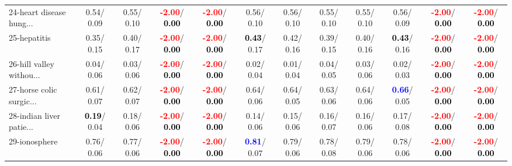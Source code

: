 \begin{table}[h]
\begin{center}
{\begin{tabular}{lc|c|c|c|c|c|c|c|c|c|c}
24-heart disease hung... &   0.54/  0.09 &   0.55/  0.10 & \textcolor{red}{\textbf{ -2.00}}/\textcolor{black}{\textbf{  0.00}} & \textcolor{red}{\textbf{ -2.00}}/\textcolor{black}{\textbf{  0.00}} &   0.56/  0.10 &   0.56/  0.10 &   0.55/  0.10 &   0.55/  0.10 &   0.56/  0.09 & \textcolor{red}{\textbf{ -2.00}}/\textcolor{black}{\textbf{  0.00}} & \textcolor{red}{\textbf{ -2.00}}/\textcolor{black}{\textbf{  0.00}} \\
25-hepatitis &   0.35/  0.15 &   0.40/  0.17 & \textcolor{red}{\textbf{ -2.00}}/\textcolor{black}{\textbf{  0.00}} & \textcolor{red}{\textbf{ -2.00}}/\textcolor{black}{\textbf{  0.00}} & \textcolor{black}{\textbf{  0.43}}/  0.17 &   0.42/  0.16 &   0.39/  0.15 &   0.40/  0.16 & \textcolor{black}{\textbf{  0.43}}/  0.16 & \textcolor{red}{\textbf{ -2.00}}/\textcolor{black}{\textbf{  0.00}} & \textcolor{red}{\textbf{ -2.00}}/\textcolor{black}{\textbf{  0.00}} \\
26-hill valley withou... &   0.04/  0.06 &   0.03/  0.06 & \textcolor{red}{\textbf{ -2.00}}/\textcolor{black}{\textbf{  0.00}} & \textcolor{red}{\textbf{ -2.00}}/\textcolor{black}{\textbf{  0.00}} &   0.02/  0.04 &   0.01/  0.04 &   0.04/  0.05 &   0.03/  0.06 &   0.02/  0.03 & \textcolor{red}{\textbf{ -2.00}}/\textcolor{black}{\textbf{  0.00}} & \textcolor{red}{\textbf{ -2.00}}/\textcolor{black}{\textbf{  0.00}} \\
27-horse colic surgic... &   0.61/  0.07 &   0.62/  0.07 & \textcolor{red}{\textbf{ -2.00}}/\textcolor{black}{\textbf{  0.00}} & \textcolor{red}{\textbf{ -2.00}}/\textcolor{black}{\textbf{  0.00}} &   0.64/  0.06 &   0.64/  0.05 &   0.63/  0.06 &   0.64/  0.06 & \textcolor{blue}{\textbf{  0.66}}/  0.05 & \textcolor{red}{\textbf{ -2.00}}/\textcolor{black}{\textbf{  0.00}} & \textcolor{red}{\textbf{ -2.00}}/\textcolor{black}{\textbf{  0.00}} \\
28-indian liver patie... & \textcolor{black}{\textbf{  0.19}}/  0.04 &   0.18/  0.06 & \textcolor{red}{\textbf{ -2.00}}/\textcolor{black}{\textbf{  0.00}} & \textcolor{red}{\textbf{ -2.00}}/\textcolor{black}{\textbf{  0.00}} &   0.14/  0.06 &   0.15/  0.06 &   0.16/  0.07 &   0.16/  0.06 &   0.17/  0.08 & \textcolor{red}{\textbf{ -2.00}}/\textcolor{black}{\textbf{  0.00}} & \textcolor{red}{\textbf{ -2.00}}/\textcolor{black}{\textbf{  0.00}} \\ \hline
29-ionosphere &   0.76/  0.06 &   0.77/  0.06 & \textcolor{red}{\textbf{ -2.00}}/\textcolor{black}{\textbf{  0.00}} & \textcolor{red}{\textbf{ -2.00}}/\textcolor{black}{\textbf{  0.00}} & \textcolor{blue}{\textbf{  0.81}}/  0.07 &   0.79/  0.06 &   0.78/  0.08 &   0.79/  0.06 &   0.78/  0.06 & \textcolor{red}{\textbf{ -2.00}}/\textcolor{black}{\textbf{  0.00}} & \textcolor{red}{\textbf{ -2.00}}/\textcolor{black}{\textbf{  0.00}} \\

\end{tabular}}
\end{center}
\end{table}
